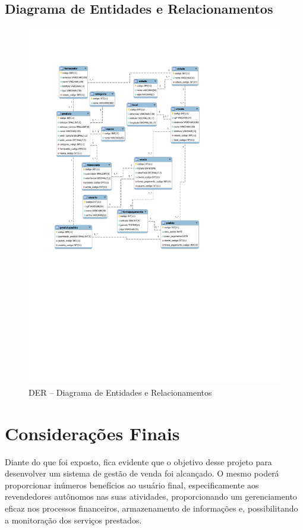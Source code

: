 \documentclass[chapter=TITLE,12pt,oneside,a4paper,english,french,sumario=tradicional,spanish,brazil,]{abntex2}
\begin{document}
\section{Diagrama de Entidades e Relacionamentos}
\begin{figure}[h]\centering
	\includegraphics[scale=1.29]{der.pdf}\caption{DER – Diagrama de Entidades e Relacionamentos}
\end{figure}

\chapter{Considerações Finais}
Diante do que foi exposto, fica evidente que o objetivo desse projeto para desenvolver um sistema de gestão de venda foi alcançado. O mesmo poderá proporcionar inúmeros benefícios ao usuário final, especificamente aos revendedores autônomos nas suas atividades, proporcionando um gerenciamento eficaz nos processos financeiros, armazenamento de informações e, possibilitando a monitoração dos serviços prestados.
\end{document}
